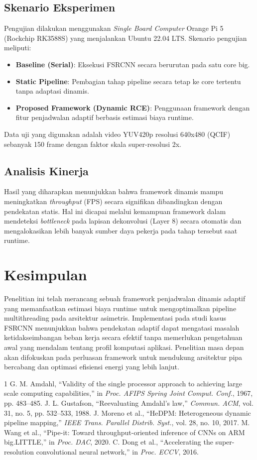 \documentclass[conference]{IEEEtran}
\begin{document}
\subsection{Skenario Eksperimen}
Pengujian dilakukan menggunakan \textit{Single Board Computer} Orange Pi 5 (Rockchip RK3588S) yang menjalankan Ubuntu 22.04 LTS. Skenario pengujian meliputi:
\begin{itemize}
    \item \textbf{Baseline (Serial)}: Eksekusi FSRCNN secara berurutan pada satu core big.
    \item \textbf{Static Pipeline}: Pembagian tahap pipeline secara tetap ke core tertentu tanpa adaptasi dinamis.
    \item \textbf{Proposed Framework (Dynamic RCE)}: Penggunaan framework dengan fitur penjadwalan adaptif berbasis estimasi biaya runtime.
\end{itemize}
Data uji yang digunakan adalah video YUV420p resolusi 640x480 (QCIF) sebanyak 150 frame dengan faktor skala super-resolusi 2x.

\subsection{Analisis Kinerja}
Hasil yang diharapkan menunjukkan bahwa framework dinamis mampu meningkatkan \textit{throughput} (FPS) secara signifikan dibandingkan dengan pendekatan statis. Hal ini dicapai melalui kemampuan framework dalam mendeteksi \textit{bottleneck} pada lapisan dekonvolusi (Layer 8) secara otomatis dan mengalokasikan lebih banyak sumber daya pekerja pada tahap tersebut saat runtime.

\section{Kesimpulan}
Penelitian ini telah merancang sebuah framework penjadwalan dinamis adaptif yang memanfaatkan estimasi biaya runtime untuk mengoptimalkan pipeline multithreading pada arsitektur asimetris. Implementasi pada studi kasus FSRCNN menunjukkan bahwa pendekatan adaptif dapat mengatasi masalah ketidakseimbangan beban kerja secara efektif tanpa memerlukan pengetahuan awal yang mendalam tentang profil komputasi aplikasi. Penelitian masa depan akan difokuskan pada perluasan framework untuk mendukung arsitektur pipa bercabang dan optimasi efisiensi energi yang lebih lanjut.

\begin{thebibliography}{1}
 G. M. Amdahl, ``Validity of the single processor approach to achieving large scale computing capabilities,'' in \textit{Proc. AFIPS Spring Joint Comput. Conf.}, 1967, pp. 483--485.
 J. L. Gustafson, ``Reevaluating Amdahl's law,'' \textit{Commun. ACM}, vol. 31, no. 5, pp. 532--533, 1988.
 J. Moreno et al., ``HeDPM: Heterogeneous dynamic pipeline mapping,'' \textit{IEEE Trans. Parallel Distrib. Syst.}, vol. 28, no. 10, 2017.
 M. Wang et al., ``Pipe-it: Toward throughput-oriented inference of CNNs on ARM big.LITTLE,'' in \textit{Proc. DAC}, 2020.
 C. Dong et al., ``Accelerating the super-resolution convolutional neural network,'' in \textit{Proc. ECCV}, 2016.
\end{thebibliography}
\end{document}
